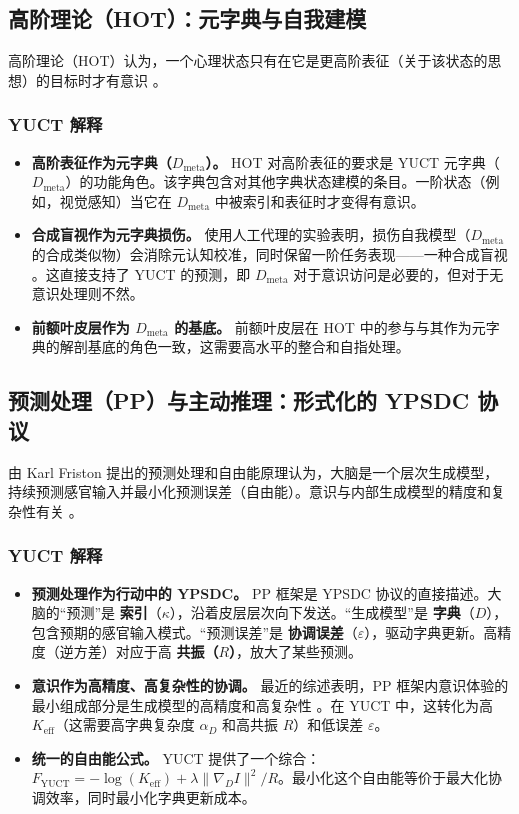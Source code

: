 \documentclass[12pt,a4paper]{article}
\begin{document}
	\subsection{高阶理论（HOT）：元字典与自我建模}
	
	高阶理论（HOT）认为，一个心理状态只有在它是更高阶表征（关于该状态的思想）的目标时才有意识 \cite{Rosenthal2005, Seth2022}。
	
	\subsubsection*{YUCT 解释}
	\begin{itemize}
		\item \textbf{高阶表征作为元字典（$D_{\text{meta}}$）。} HOT 对高阶表征的要求是 YUCT 元字典（$D_{\text{meta}}$）的功能角色。该字典包含对其他字典状态建模的条目。一阶状态（例如，视觉感知）当它在 $D_{\text{meta}}$ 中被索引和表征时才变得有意识。
		\item \textbf{合成盲视作为元字典损伤。} 使用人工代理的实验表明，损伤自我模型（$D_{\text{meta}}$ 的合成类似物）会消除元认知校准，同时保留一阶任务表现——一种合成盲视 \cite{Phua2026}。这直接支持了 YUCT 的预测，即 $D_{\text{meta}}$ 对于意识访问是必要的，但对于无意识处理则不然。
		\item \textbf{前额叶皮层作为 $D_{\text{meta}}$ 的基底。} 前额叶皮层在 HOT 中的参与与其作为元字典的解剖基底的角色一致，这需要高水平的整合和自指处理。
	\end{itemize}
	
	\subsection{预测处理（PP）与主动推理：形式化的 YPSDC 协议}
	
	由 Karl Friston 提出的预测处理和自由能原理认为，大脑是一个层次生成模型，持续预测感官输入并最小化预测误差（自由能）\cite{Friston2010, Clark2016}。意识与内部生成模型的精度和复杂性有关 \cite{Hohwy2013}。
	
	\subsubsection*{YUCT 解释}
	\begin{itemize}
		\item \textbf{预测处理作为行动中的 YPSDC。} PP 框架是 YPSDC 协议的直接描述。大脑的“预测”是 \textbf{索引}（$\kappa$），沿着皮层层次向下发送。“生成模型”是 \textbf{字典}（$D$），包含预期的感官输入模式。“预测误差”是 \textbf{协调误差}（$\varepsilon$），驱动字典更新。高精度（逆方差）对应于高 \textbf{共振（\(R\)）}，放大了某些预测。
		\item \textbf{意识作为高精度、高复杂性的协调。} 最近的综述表明，PP 框架内意识体验的最小组成部分是生成模型的高精度和高复杂性 \cite{Wiese2017}。在 YUCT 中，这转化为高 $K_{\mathrm{eff}}$（这需要高字典复杂度 $\alpha_D$ 和高共振 $R$）和低误差 $\varepsilon$。
		\item \textbf{统一的自由能公式。} YUCT 提供了一个综合：$F_{\mathrm{YUCT}} = -\log(K_{\mathrm{eff}}) + \lambda \|\nabla_D I\|^2 / R$。最小化这个自由能等价于最大化协调效率，同时最小化字典更新成本。
	\end{itemize}
	
\end{document}
